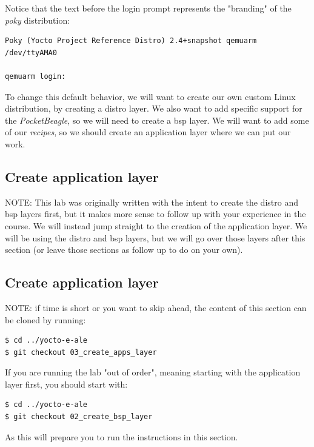 \documentclass[a4paper,12pt,obeyspaces,spaces,hyphens]{article}
\newcommand{\code}[1]
{\path{#1}}
\begin{document}
Notice that the text before the login prompt represents the "branding" of the {\em poky} distribution:
\begin{tcolorbox}[enhanced jigsaw,colback=bg,boxrule=0pt,arc=0pt]
\begin{verbatim}
Poky (Yocto Project Reference Distro) 2.4+snapshot qemuarm /dev/ttyAMA0

qemuarm login:
\end{verbatim}
\end{tcolorbox}

To change this default behavior, we will want to create our own custom Linux distribution, by creating a distro layer. We also want to add specific support for the {\em PocketBeagle}, so we will need to create a bsp layer. We will want to add some of our {\em recipes}, so we should create an application layer where we can put our work.

\subsection{Create application layer}
\begin{tcolorbox}[enhanced jigsaw,colback=notes,boxrule=0pt,arc=0pt]
NOTE: This lab was originally written with the intent to create the distro and bsp layers first, but it makes more sense to follow up with your experience in the \code{yocto-intro} course. We will instead jump straight to the creation of the application layer. We will be using the distro and bsp layers, but we will go over those layers after this section (or leave those sections as follow up to do on your own).
\end{tcolorbox}

\subsection{Create application layer}
\begin{tcolorbox}[enhanced jigsaw,colback=notes,boxrule=0pt,arc=0pt]
NOTE: if time is short or you want to skip ahead, the content of this section can be cloned by running:
\begin{verbatim}
$ cd ../yocto-e-ale
$ git checkout 03_create_apps_layer
\end{verbatim}

If you are running the lab "out of order", meaning starting with the application layer first, you should start with:
\begin{verbatim}
$ cd ../yocto-e-ale
$ git checkout 02_create_bsp_layer
\end{verbatim}
As this will prepare you to run the instructions in this section.
\end{tcolorbox}
\end{document}
